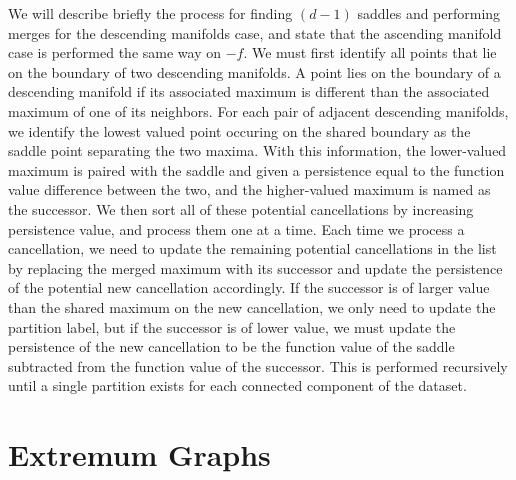 We will describe briefly the process for finding $(d-1)$ saddles and performing merges for the descending manifolds case, and state that the ascending manifold case is performed the same way on $-f$.
%
We must first identify all points that lie on the boundary of two descending manifolds.
%
A point lies on the boundary of a descending manifold if its associated maximum is different than the associated maximum of one of its neighbors.
%
For each pair of adjacent descending manifolds, we identify the lowest valued point occuring on the shared boundary as the saddle point separating the two maxima.
%
With this information, the lower-valued maximum is paired with the saddle and given a persistence equal to the function value difference between the two, and the higher-valued maximum is named as the successor.
%
We then sort all of these potential cancellations by increasing persistence value, and process them one at a time.
%
Each time we process a cancellation, we need to update the remaining potential cancellations in the list by replacing the merged maximum with its successor and update the persistence of the potential new cancellation accordingly.
%
If the successor is of larger value than the shared maximum on the new
cancellation, we only need to update the partition label, but if the successor is of lower value, we must update the persistence of the new cancellation to be the function value of the saddle subtracted from the function value of the successor.
%
This is performed recursively until a single partition exists for each connected component of the dataset.


\section{Extremum Graphs}
\label{sec:extremumGraph}


% 